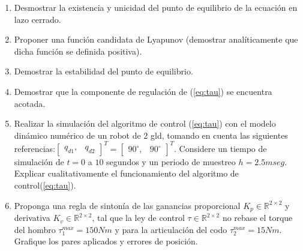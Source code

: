 \documentclass[12pt]{article}
\begin{document}
\begin{enumerate}
    \item Desmostrar la existencia y unicidad del punto de equilibrio de la ecuación en lazo cerrado.
    \item Proponer una función candidata de Lyapunov (demostrar analíticamente que dicha función se definida positiva).
    \item Demostrar la estabilidad del punto de equilibrio.
    \item Demostrar que la componente de regulación de (\ref{eq:tau}) se encuentra acotada.
    \item Realizar la simulación del algoritmo de control (\ref{eq:tau}) con el modelo dinámico numérico de un robot de 2 gld, tomando en cuenta las siguientes referencias:$\begin{bmatrix}
        q_{d1},&q_{d2}
    \end{bmatrix}^T=
    \begin{bmatrix}
    90^{\circ},&90^{\circ}
    \end{bmatrix}^T$. Considere un tiempo de simulación de $t=0$ a $10$ segundos y un periodo de muestreo $h=2.5mseg$. Explicar cualitativamente el funcionamiento del algoritmo de control(\ref{eq:tau}).
    \item Proponga una regla de sintonía de las ganancias proporcional $K_p\in \mathbb{R}^{2\times 2}$ y derivativa $K_v\in \mathbb{R}^{2\times 2}$, tal que la ley de control $\tau\in \mathbb{R}^{2\times 2}$ no rebase el torque del hombro $\tau^{max}_{1}=150Nm$ y para la articulación del codo $\tau^{max}_{2}=15Nm$. Grafique los pares aplicados y errores de posición.
\end{enumerate}
\end{document}
